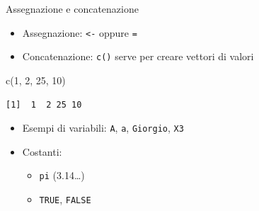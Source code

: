 \documentclass[
  ignorenonframetext,
  compress, aspectratio=149]{beamer}
\newenvironment{Shaded}{}{}
\newcommand{\DecValTok}[1]{\textcolor[rgb]{0.69,0.50,0.00}{#1}}
\newcommand{\FunctionTok}[1]{\textcolor[rgb]{0.39,0.29,0.61}{#1}}
\newcommand{\NormalTok}[1]{\textcolor[rgb]{0.12,0.11,0.11}{#1}}
\providecommand{\tightlist}{%
  \setlength{\itemsep}{0pt}\setlength{\parskip}{0pt}}
\begin{document}
\begin{frame}[fragile]{Assegnazione e concatenazione}
\label{assegnazione-e-concatenazione}
\begin{itemize}
\tightlist
\item
  Assegnazione: \texttt{\textless{}-} oppure \texttt{=}
\item
  Concatenazione: \texttt{c()} serve per creare vettori di valori
\end{itemize}

\begin{Shaded}
\begin{Highlighting}[]
\FunctionTok{c}\NormalTok{(}\DecValTok{1}\NormalTok{, }\DecValTok{2}\NormalTok{, }\DecValTok{25}\NormalTok{, }\DecValTok{10}\NormalTok{)}
\end{Highlighting}
\end{Shaded}

\begin{verbatim}
[1]  1  2 25 10
\end{verbatim}

\pause

\begin{itemize}
\tightlist
\item
  Esempi di variabili: \texttt{A}, \texttt{a}, \texttt{Giorgio},
  \texttt{X3}
\item
  Costanti:

  \begin{itemize}
  \tightlist
  \item
    \texttt{pi} (3.14\ldots)
  \item
    \texttt{TRUE}, \texttt{FALSE}
  \end{itemize}
\end{itemize}
\end{frame}
\end{document}
